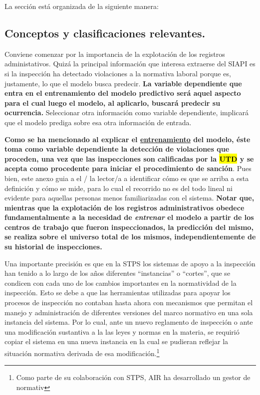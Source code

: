 \documentclass[
]{article}
\begin{document}
La sección está organizada de la siguiente manera:

\hypertarget{conceptos-y-clasificaciones-relevantes.}{%
\subsection{Conceptos y clasificaciones relevantes.}\label{conceptos-y-clasificaciones-relevantes.}}

Conviene comenzar por la importancia de la explotación de los registros administativos. Quizá la principal información que interesa extraerse del SIAPI es si la inspección ha detectado violaciones a la normativa laboral porque es, justamente, lo que el modelo busca predecir. \textbf{La variable dependiente que entra en el entrenamiento del modelo predictivo será aquel aspecto para el cual luego el modelo, al aplicarlo, buscará predecir su ocurrencia.} Seleccionar otra información como variable dependiente, implicará que el modelo prediga sobre esa otra información de entrada.

\textbf{Como se ha mencionado al explicar el \protect\hyperlink{procesamientoModIVSIAPI}{entrenamiento} del modelo, éste toma como variable dependiente la detección de violaciones que proceden, una vez que las inspecciones son calificadas por la \hl{UTD} y se acepta como procedente para iniciar el procedimiento de sanción}. Pues bien, este anexo guia a el / la lector/a a identificar cómo es que se arriba a esta definición y cómo se mide, para lo cual el recorrido no es del todo lineal ni evidente para aquellas personas menos familiarizadas con el sistema. \textbf{Notar que, mientras que la explotación de los registros administrativos obedece fundamentalmente a la necesidad de \emph{entrenar} el modelo a partir de los centros de trabajo que fueron inspeccionados, la predicción del mismo, se realiza sobre el universo total de los mismos, independientemente de su historial de inspecciones.}

Una importante precisión es que en la STPS los sistemas de apoyo a la inspección han tenido a lo largo de los años diferentes ``instancias'' o ``cortes'', que se condicen con cada uno de los cambios importantes en la normatividad de la inspección. Esto se debe a que las herramientas utilizadas para apoyar los procesos de inspección no contaban hasta ahora con mecanismos que permitan el manejo y administración de diferentes versiones del marco normativo en una sola instancia del sistema. Por lo cual, ante un nuevo reglamento de inspección o ante una modificación sustantiva a la las leyes y normas en la materia, se requirió copiar el sistema en una nueva instancia en la cual se pudieran reflejar la situación normativa derivada de esa modificación.\footnote{Como parte de su colaboración con STPS, AIR ha desarrollado un gestor de normativ}
\end{document}
